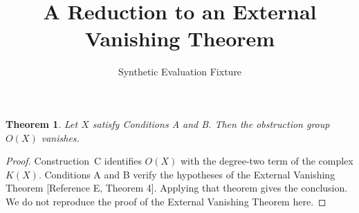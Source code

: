 \documentclass{article}
\title{A Reduction to an External Vanishing Theorem}
\author{Synthetic Evaluation Fixture}
\newtheorem{theorem}{Theorem}
\begin{document}
\maketitle

\begin{theorem}\label{th:vanishing-application}
Let $X$ satisfy Conditions A and B. Then the obstruction group $O(X)$ vanishes.
\end{theorem}

\begin{proof}
Construction~C identifies $O(X)$ with the degree-two term of the complex $K(X)$. Conditions A and B verify the hypotheses of the External Vanishing Theorem [Reference E, Theorem 4]. Applying that theorem gives the conclusion. We do not reproduce the proof of the External Vanishing Theorem here.
\end{proof}
\end{document}
